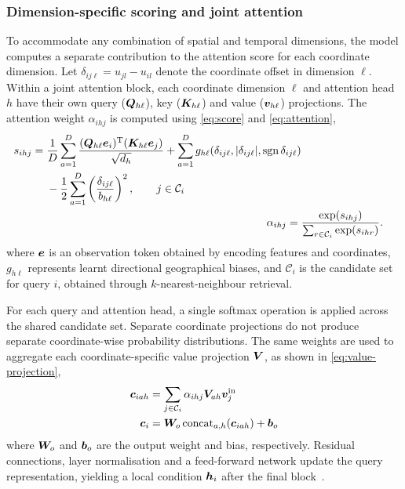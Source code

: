 \documentclass[]{interact}
\newcommand{\cand}{\mathcal{C}}
\begin{document}
\subsubsection{Dimension-specific scoring and joint attention}

To accommodate any combination of spatial and temporal dimensions, the model computes a separate contribution to the attention score for each coordinate dimension.
Let $\delta_{ij\ell}=u_{jl}-u_{il}$ denote the coordinate offset in dimension $\ell$.
Within a joint attention block, each coordinate dimension $\ell$ and attention head $h$ have their own query ($\bm{Q}_{h\ell}$), key ($\bm{K}_{h\ell}$) and value ($\bm{v}_{h\ell}$) projections.
The attention weight $\alpha_{ihj}$ is computed using \autoref{eq:score} and \autoref{eq:attention},
\begin{align}
  \label{eq:score}
  \begin{split}
    s_{ihj}={}
    &\frac{1}{D}\sum_{a=1}^D
    \frac{(\vQ_{h\ell}\ve_i)\T(\vK_{h\ell}\ve_j)}{\sqrt{d_h}}
    +\sum_{a=1}^D g_{h\ell}(\delta_{ij\ell},|\delta_{ij\ell}|,\operatorname{sgn}\delta_{ij\ell}) \\
    &-\frac{1}{2}\sum_{a=1}^D
    \left(\frac{\delta_{ij\ell}}{b_{h\ell}}\right)^2,
    \qquad j\in\cand_i
  \end{split} \\
  \label{eq:attention}
  \alpha_{ihj}={}&\frac{\exp(s_{ihj})}{\sum_{r\in\cand_i}\exp(s_{ihr})}.
\end{align}
where $\bm{e}$ is an observation token obtained by encoding features and coordinates, $g_{h\ell}$ represents learnt directional geographical biases, and $\cand_i$ is the candidate set for query $i$, obtained through $k$-nearest-neighbour retrieval.

For each query and attention head, a single softmax operation is applied across the shared candidate set.
Separate coordinate projections do not produce separate coordinate-wise probability distributions.
The same weights are used to aggregate each coordinate-specific value projection $\bm{V}$, as shown in \autoref{eq:value-projection},
\begin{align}\label{eq:value-projection}
  \begin{split}
    \vc_{iah}&=\sum_{j\in\cand_i}\alpha_{ihj}\vV_{ah}\bv^{\rm in}_j \\
    \vc_i&=\vW_o\operatorname{concat}_{a,h}(\vc_{iah})+\vb_o 
  \end{split}
\end{align}
where $\bm{W}_o$ and $\bm{b}_o$ are the output weight and bias, respectively.
Residual connections, layer normalisation and a feed-forward network update the query representation,
yielding a local condition $\bm{h}_i$ after the final block~\citep{BaKiros-2016}.
\end{document}
